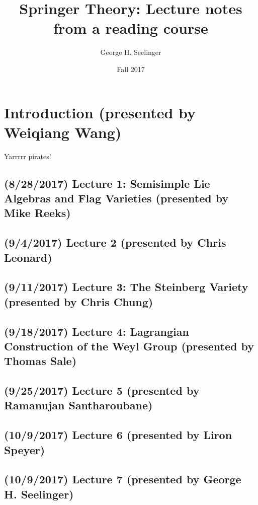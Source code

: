 \documentclass[11pt,leqno,oneside]{amsbook}
\title[Springer Theory]{Springer Theory: Lecture notes from a reading course}
\author{George H. Seelinger}
\date{Fall 2017}
\numberwithin{thm}{section}
\begin{document}
\maketitle
\pagebreak
\section{Introduction (presented by Weiqiang Wang)}
Yarrrrr pirates!
\subsection*{(8/28/2017) Lecture 1: Semisimple Lie Algebras and Flag Varieties (presented by Mike
  Reeks)}

\subsection*{(9/4/2017) Lecture 2 (presented by Chris Leonard)}

\subsection*{(9/11/2017) Lecture 3: The Steinberg Variety (presented
  by Chris Chung)}

\subsection*{(9/18/2017) Lecture 4: Lagrangian Construction of the
  Weyl Group (presented by Thomas Sale)}

\subsection*{(9/25/2017) Lecture 5 (presented by Ramanujan
  Santharoubane)}

\subsection*{(10/9/2017) Lecture 6 (presented by Liron Speyer)}
\subsection*{(10/9/2017) Lecture 7 (presented by George
  H. Seelinger)}

\begin{bibdiv}
  \begin{biblist}
  \end{biblist}
\end{bibdiv}
\end{document}
